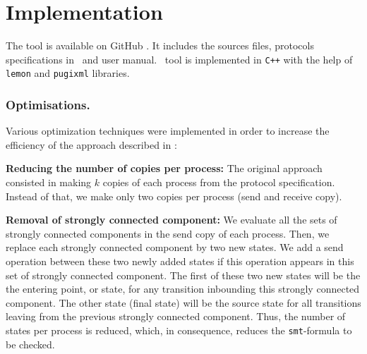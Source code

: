 \section{Implementation}
\label{sec:optim}

The tool is available on GitHub \cite{github.MPass}.
It includes the sources files, protocols specifications in \xml\ and user manual.
%
\MPass\ tool is implemented in \texttt{C++} with the help of {\tt lemon} and {\tt pugixml} libraries.

\subsubsection{Optimisations.}

Various optimization techniques were implemented in order to increase the efficiency of the approach described in  \cite{AAC13}:

\begin{description}
\item{\textbf{Reducing the number of copies per process:}}
The original approach consisted in making $k$ copies of each process from the protocol specification.
Instead of that, we make only two copies per process (send and receive copy).
%
\item{\textbf{Removal of strongly connected component:}}
We evaluate all the sets of strongly connected components in the send copy of each process. 
Then, we replace each strongly connected component by two new states.
We add a send operation between these two newly added states if this operation appears in this set of strongly connected component.
The first of these two new states will be the the entering point, or state, for any transition inbounding this strongly connected component.
The other state (final state) will be  the source state for all transitions leaving from the previous strongly connected component.
Thus, the number of states per process is reduced, which, in consequence, reduces the \texttt{smt}-formula to be checked.
\end{description}
